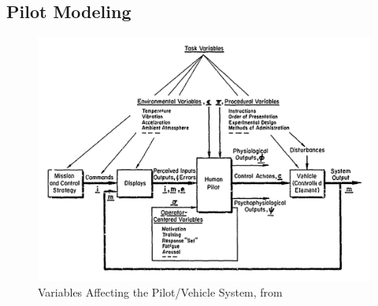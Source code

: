 \documentclass[float=false, crop=false]{standalone}
\begin{document}

\subsection{Pilot Modeling}
\begin{figure}[tb]
    \begin{center}
        \includegraphics[width=0.8\linewidth]{./../img/Screen Shot 2018-07-25 at 10.37.08 AM.png}
        \caption{Variables Affecting the Pilot/Vehicle System, from~\cite{McRuer1974}}
        \label{figure:mcruer1974}
    \end{center}
\end{figure}
\end{document}
